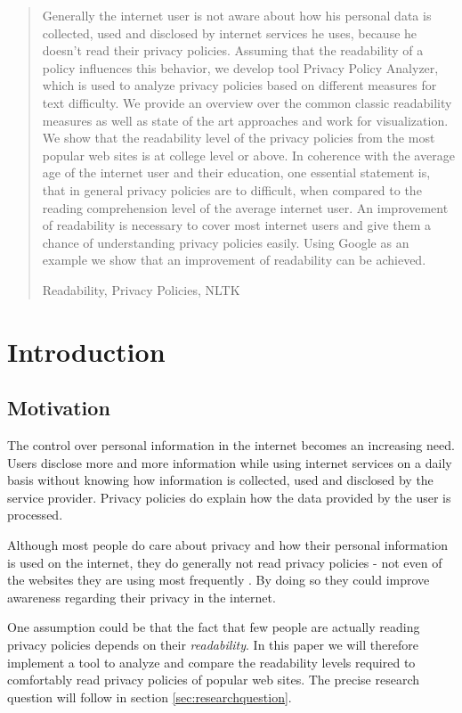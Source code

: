 \documentclass[runningheads,a4paper]{llncs}
\newcommand{\keywords}[1]{\par\addvspace\baselineskip
\noindent\keywordname\enspace\ignorespaces#1}
\begin{document}
\begin{abstract}
Generally the internet user is not aware about how his personal data is collected, used and disclosed by internet services he uses, because he doesn't read their privacy policies. Assuming that the readability of a policy influences this behavior, we develop tool Privacy Policy Analyzer, which is used to analyze privacy policies based on different measures for text difficulty. We provide an overview over the common classic readability measures as well as state of the art approaches and work for visualization. We show that the readability level of the privacy policies from the most popular web sites is at college level or above. In coherence with the average age of the internet user and their education, one essential statement is, that in general privacy policies are to difficult, when compared to the reading comprehension level of the average internet user. An improvement of readability is necessary to cover most internet users and give them a chance of understanding privacy policies easily. Using Google as an example we show that an improvement of readability can be achieved.

\keywords{Readability, Privacy Policies, NLTK}
\end{abstract}

\section{Introduction}
\subsection{Motivation}
The control over personal information in the internet becomes an increasing need. Users disclose more and more information while using internet services on a daily basis without knowing how information is collected, used and disclosed by the service provider. Privacy policies do explain how the data provided by the user is processed.

Although most people do care about privacy and how their personal information is used on the internet, they do generally not read privacy policies - not even of the websites they are using most frequently \cite{Singleton2001}. By doing so they could improve awareness regarding their privacy in the internet.

One assumption could be that the fact that few people are actually reading privacy policies depends on their \emph{readability}. In this paper we will therefore implement a tool to analyze and compare the readability levels required to comfortably read privacy policies of popular web sites. The precise research question will follow in section \ref{sec:researchquestion}.
\end{document}
